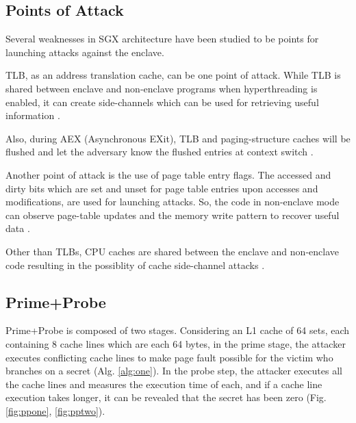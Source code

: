 \subsection{Points of Attack}
Several weaknesses in SGX architecture have been studied to be points for launching attacks against the enclave.

TLB, as an address translation cache, can be one point of attack. While TLB is shared between enclave and non-enclave programs when hyperthreading is enabled, it can create side-channels which can be used for retrieving useful information \cite{leakycauldron}.

Also, during AEX (Asynchronous EXit), TLB and paging-structure caches will be flushed and let the adversary know the flushed entries at context switch \cite{leakycauldron}.

Another point of attack is the use of page table entry flags. The accessed and dirty bits which are set and unset for page table entries upon accesses and modifications, are used for launching attacks. So, the code in non-enclave mode can observe page-table updates and the memory write pattern to recover useful data \cite{leakycauldron,stealthy}.

Other than TLBs, CPU caches are shared between the enclave and non-enclave code resulting in the possiblity of cache side-channel attacks \cite{leakycauldron}.

\subsection{Prime+Probe}
Prime+Probe is composed of two stages. Considering an L1 cache of 64 sets, each containing 8 cache lines which are each 64 bytes, in the prime stage, the attacker executes conflicting cache lines to make page fault possible for the victim who branches on a secret (Alg. \ref{alg:one}). In the probe step, the attacker executes all the cache lines and measures the execution time of each, and if a cache line execution takes longer, it can be revealed that the secret has been zero \cite{primeprobe1,primeprobe2,cloak} (Fig. \ref{fig:ppone}, \ref{fig:pptwo}).

